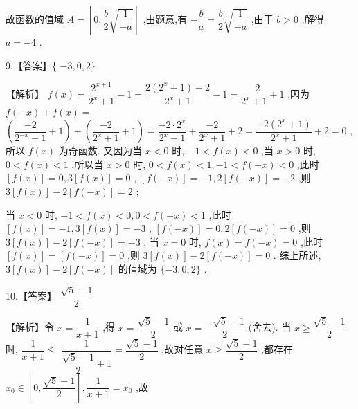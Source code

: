\documentclass[10pt]{article}
\begin{document}
故函数的值域 $A = \left\lbrack  {0,\dfrac{b}{2}\sqrt{\dfrac{1}{-a}}}\right\rbrack$ ,由题意,有 $- \dfrac{b}{a} = \dfrac{b}{2}\sqrt{\dfrac{1}{-a}}$ ,由于 $b > 0$ ,解得 $a =  - 4$ .

9.【答案】\{ $- 3,0,2\}$

【解析】 $f\left( x\right)  = \dfrac{{2}^{x + 1}}{{2}^{x} + 1} - 1 = \dfrac{2\left( {{2}^{x} + 1}\right)  - 2}{{2}^{x} + 1} - 1 = \dfrac{-2}{{2}^{x} + 1} + 1$ ,因为 $f\left( {-x}\right)  + f\left( x\right)  =$  $\left( {\dfrac{-2}{{2}^{-x} + 1} + 1}\right)  + \left( {\dfrac{-2}{{2}^{x} + 1} + 1}\right)  = \dfrac{-2 \cdot  {2}^{x}}{{2}^{x} + 1} + \dfrac{-2}{{2}^{x} + 1} + 2 = \dfrac{-2\left( {{2}^{x} + 1}\right) }{{2}^{x} + 1} + 2 = 0$ ,所以 $f\left( x\right)$ 为奇函数. 又因为当 $x < 0$ 时, $- 1 < f\left( x\right)  < 0$ ,当 $x > 0$ 时, $0 < f\left( x\right)  < 1$ ,所以当 $x > 0$ 时, $0 < f\left( x\right)  < 1, - 1 < f\left( {-x}\right)  < 0$ ,此时 $\left\lbrack  {f\left( x\right) }\right\rbrack   = 0,3\left\lbrack  {f\left( x\right) }\right\rbrack   = 0$ , $\left\lbrack  {f\left( {-x}\right) }\right\rbrack   =  - 1,2\left\lbrack  {f\left( {-x}\right) }\right\rbrack   =  - 2$ ,则 $3\left\lbrack  {f\left( x\right) }\right\rbrack   - 2\left\lbrack  {f\left( {-x}\right) }\right\rbrack   = 2$ ;

当 $x < 0$ 时, $- 1 < f\left( x\right)  < 0,0 < f\left( {-x}\right)  < 1$ ,此时 $\left\lbrack  {f\left( x\right) }\right\rbrack   =  - 1,3\left\lbrack  {f\left( x\right) }\right\rbrack   =  - 3$ , $\left\lbrack  {f\left( {-x}\right) }\right\rbrack   = 0,2\left\lbrack  {f\left( {-x}\right) }\right\rbrack   = 0$ ,则 $3\left\lbrack  {f\left( x\right) }\right\rbrack   - 2\left\lbrack  {f\left( {-x}\right) }\right\rbrack   =  - 3$ ; 当 $x = 0$ 时, $f\left( x\right)  = f\left( {-x}\right)  = 0$ ,此时 $\left\lbrack  {f\left( x\right) }\right\rbrack   = \left\lbrack  {f\left( {-x}\right) }\right\rbrack   = 0$ ,则 $3\left\lbrack  {f\left( x\right) }\right\rbrack   - 2\left\lbrack  {f\left( {-x}\right) }\right\rbrack   = 0$ . 综上所述, $3\left\lbrack  {f\left( x\right) }\right\rbrack   - 2\left\lbrack  {f\left( {-x}\right) }\right\rbrack$ 的值域为 $\{  - 3,0,2\}$ .

10.【答案】 $\dfrac{\sqrt{5} - 1}{2}$

【解析】令 $x = \dfrac{1}{x + 1}$ ,得 $x = \dfrac{\sqrt{5} - 1}{2}$ 或 $x = \dfrac{-\sqrt{5} - 1}{2}$ (舍去). 当 $x \geq  \dfrac{\sqrt{5} - 1}{2}$ 时, $\dfrac{1}{x + 1} \leq$  $\dfrac{1}{\dfrac{\sqrt{5} - 1}{2} + 1} = \dfrac{\sqrt{5} - 1}{2}$ ,故对任意 $x \geq  \dfrac{\sqrt{5} - 1}{2}$ ,都存在 ${x}_{0} \in  \left\lbrack  {0,\dfrac{\sqrt{5} - 1}{2}}\right\rbrack  ,\dfrac{1}{x + 1} = {x}_{0}$ ,故
\end{document}

